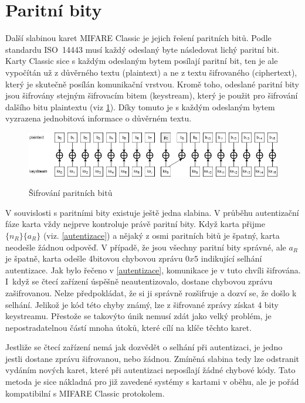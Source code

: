 \section{Paritní bity}
\label{paritni_bity}
Další slabinou karet MIFARE Classic je jejich řešení paritních bitů. Podle standardu ISO~14443 musí každý odeslaný byte následovat lichý paritní bit. Karty Classic sice s každým odeslaným bytem posílají paritní bit, ten je ale vypočítán už z důvěrného textu (plaintext) a ne z textu šifrovaného (ciphertext), který je skutečně posílán komunikační vrstvou. Kromě toho, odeslané paritní bity jsou šifrovány stejným šifrovacím bitem (keystream), který je použit pro šifrování dalšího bitu plaintextu (viz \ref{parityDiagram})\cite{Cryptanalisis}.
Díky tomuto je s každým odeslaným bytem vyzrazena jednobitová informace o důvěrném textu\cite{Dismantling_Mifare_Classic}. 
\begin{figure}[ht]\centering
  \centering
  \includegraphics[width=\linewidth]{obrazky-figures/parityBits.png}\\[1pt]  
  \caption{Šifrování paritních bitů \cite{Cryptanalisis}}   
  \label{parityDiagram}
\end{figure}
\par
V souvislosti s paritními bity existuje ještě jedna slabina. V průběhu autentizační fáze karta vždy nejprve kontroluje právě paritní bity. Když karta přijme $\{n_R\}\{a_R\}$ (viz. \ref{autentizace}) a nějaký z osmi paritních bitů je špatný, karta neodešle žádnou odpověď. V případě, že jsou všechny paritní bity správné, ale $a_R$ je špatně, karta odešle 4bitovou chybovou zprávu $0x5$ indikující selhání autentizace. Jak bylo řečeno v \ref{autentizace}, komunikace je v tuto chvíli šifrována. I~když se čtecí zařízení úspěšně neautentizovalo, dostane chybovou zprávu zašifrovanou. Nelze předpokládat, že si ji správně rozšifruje a dozví se, že došlo k selhání.
Jelikož je kód této chyby známý, lze z šifrované zprávy získat 4 bity keystreamu. Přestože se takovýto únik nemusí zdát jako velký problém, je nepostradatelnou částí mnoha útoků, které cílí na klíče těchto karet.
\par
Jestliže se čtecí zařízení nemá jak dozvědět o selhání při autentizaci, je jedno jestli dostane zprávu šifrovanou, nebo žádnou. Zmíněná slabina tedy lze odstranit vydáním nových karet, které při autentizaci neposílají žádné chybové kódy. Tato metoda je sice nákladná pro již zavedené systémy s kartami v oběhu, ale je pořád kompatibilní s MIFARE Classic protokolem\cite{Cryptanalisis}. 

